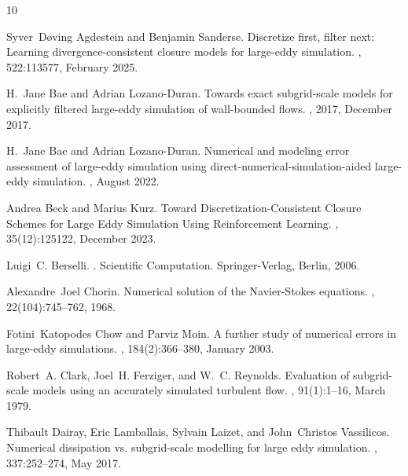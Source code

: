 \documentclass[preprint,twocolumn,5p]{elsarticle}
\begin{document}
\begin{thebibliography}{10}

Syver~D{\o}ving Agdestein and Benjamin Sanderse.
\newblock Discretize first, filter next: {{Learning}} divergence-consistent closure models for large-eddy simulation.
, 522:113577, February 2025.

H.~Jane Bae and Adrian {Lozano-Duran}.
\newblock Towards exact subgrid-scale models for explicitly filtered large-eddy simulation of wall-bounded flows.
, 2017, December 2017.

H.~Jane Bae and Adrian {Lozano-Duran}.
\newblock Numerical and modeling error assessment of large-eddy simulation using direct-numerical-simulation-aided large-eddy simulation.
, August 2022.

Andrea Beck and Marius Kurz.
\newblock Toward {{Discretization-Consistent Closure Schemes}} for {{Large Eddy Simulation Using Reinforcement Learning}}.
, 35(12):125122, December 2023.

Luigi~C. Berselli.
.
\newblock Scientific Computation. Springer-Verlag, Berlin, 2006.

Alexandre~Joel Chorin.
\newblock Numerical solution of the {{Navier-Stokes}} equations.
, 22(104):745--762, 1968.

Fotini~Katopodes Chow and Parviz Moin.
\newblock A further study of numerical errors in large-eddy simulations.
, 184(2):366--380, January 2003.

Robert~A. Clark, Joel~H. Ferziger, and W.~C. Reynolds.
\newblock Evaluation of subgrid-scale models using an accurately simulated turbulent flow.
, 91(1):1--16, March 1979.

Thibault Dairay, Eric Lamballais, Sylvain Laizet, and John~Christos Vassilicos.
\newblock Numerical dissipation vs. subgrid-scale modelling for large eddy simulation.
, 337:252--274, May 2017.


\end{thebibliography}
\end{document}
